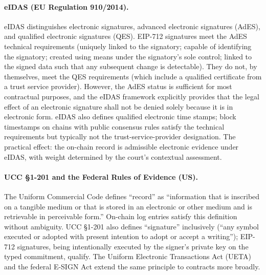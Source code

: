 \documentclass[11pt,a4paper]{article}
\theoremstyle{remark}
\begin{document}
\paragraph{eIDAS (EU Regulation 910/2014).}
eIDAS distinguishes electronic signatures, advanced electronic
signatures (AdES), and qualified electronic signatures (QES).
EIP-712 signatures meet the AdES technical requirements (uniquely
linked to the signatory; capable of identifying the signatory;
created using means under the signatory's sole control;
linked to the signed data such that any subsequent change is
detectable). They do not, by themselves, meet the QES
requirements (which include a qualified certificate from a
trust service provider). However, the AdES status is sufficient
for most contractual purposes, and the eIDAS framework explicitly
provides that the legal effect of an electronic signature shall
not be denied solely because it is in electronic form. eIDAS
also defines qualified electronic time stamps; block timestamps
on chains with public consensus rules satisfy the technical
requirements but typically not the trust-service-provider
designation. The practical effect: the on-chain record is
admissible electronic evidence under eIDAS, with weight
determined by the court's contextual assessment.

\paragraph{UCC §1-201 and the Federal Rules of Evidence (US).}
The Uniform Commercial Code defines ``record'' as ``information
that is inscribed on a tangible medium or that is stored in an
electronic or other medium and is retrievable in perceivable
form.'' On-chain log entries satisfy this definition without
ambiguity. UCC §1-201 also defines ``signature'' inclusively
(``any symbol executed or adopted with present intention to
adopt or accept a writing''); EIP-712 signatures, being
intentionally executed by the signer's private key on the typed
commitment, qualify. The Uniform Electronic Transactions Act
(UETA) and the federal E-SIGN Act extend the same principle to
contracts more broadly.
\end{document}
